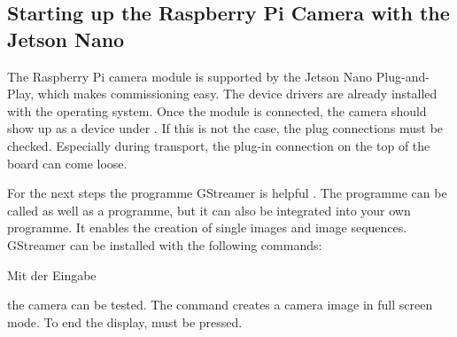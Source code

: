 %
%



\subsection{Starting up the Raspberry Pi Camera with the Jetson Nano}

The Raspberry Pi camera module is supported by the Jetson Nano Plug-and-Play, which makes commissioning easy. The device drivers are already installed with the operating system. Once the module is connected, the camera should show up as a device under . If this is not the case, the plug connections must be checked. Especially during transport, the plug-in connection on the top of the board can come loose.

For the next steps the programme GStreamer is helpful \cite{GStreamer:2021}. The programme can be called as well as a programme, but it can also be integrated into your own programme. It enables the creation of single images and image sequences. GStreamer can be installed with the following commands:

\medskip







\medskip

Mit der Eingabe 

\medskip


\medskip

the camera can be tested. The command creates a camera image in full screen mode. To end the display,  must be pressed.

\medskip

